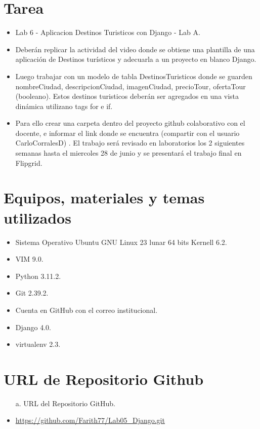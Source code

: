 \documentclass{article}
\begin{document}
	\section{Tarea}
	\begin{itemize}		
		\item Lab 6 - Aplicacion Destinos Turisticos con Django - Lab A.
		\item Deberán replicar la actividad del video donde se obtiene una plantilla de una aplicación de Destinos turísticos y adecuarla a un proyecto en blanco Django.
		\item Luego trabajar con un modelo de tabla DestinosTuristicos donde se guarden nombreCiudad,  descripcionCiudad, imagenCiudad, precioTour, ofertaTour (booleano).  Estos destinos turisticos deberán ser agregados en una vista dinámica utilizano tags for e if.
        \item Para ello crear una carpeta dentro del proyecto github colaborativo con el docente, e informar el link donde se encuentra (compartir con el usuario CarloCorralesD) .  El trabajo será revisado en laboratorios los 2 siguientes semanas hasta el miercoles 28 de junio y se presentará el trabajo final en Flipgrid.
	\end{itemize}
		
	\section{Equipos, materiales y temas utilizados}
	\begin{itemize}
		\item Sistema Operativo Ubuntu GNU Linux 23 lunar 64 bits Kernell 6.2.
		\item VIM 9.0.
		\item Python 3.11.2.
		\item Git 2.39.2.
		\item Cuenta en GitHub con el correo institucional.
		\item Django 4.0.
        \item virtualenv 2.3.
	\end{itemize}
	
	\section{URL de Repositorio Github}
	\begin{itemize}
		\item[a.] URL del Repositorio GitHub.
		\item \url{https://github.com/Farith77/Lab05_Django.git}
	\end{itemize}
	
\end{document}
